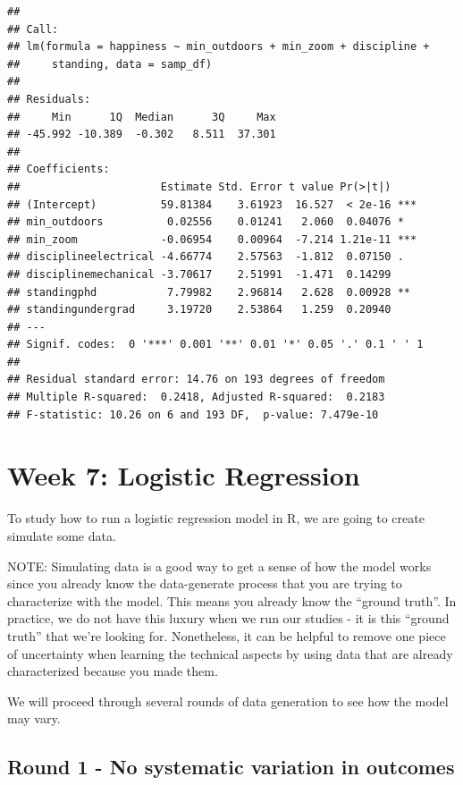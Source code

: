 \documentclass[
]{book}
\begin{document}
\begin{verbatim}
## 
## Call:
## lm(formula = happiness ~ min_outdoors + min_zoom + discipline + 
##     standing, data = samp_df)
## 
## Residuals:
##     Min      1Q  Median      3Q     Max 
## -45.992 -10.389  -0.302   8.511  37.301 
## 
## Coefficients:
##                      Estimate Std. Error t value Pr(>|t|)    
## (Intercept)          59.81384    3.61923  16.527  < 2e-16 ***
## min_outdoors          0.02556    0.01241   2.060  0.04076 *  
## min_zoom             -0.06954    0.00964  -7.214 1.21e-11 ***
## disciplineelectrical -4.66774    2.57563  -1.812  0.07150 .  
## disciplinemechanical -3.70617    2.51991  -1.471  0.14299    
## standingphd           7.79982    2.96814   2.628  0.00928 ** 
## standingundergrad     3.19720    2.53864   1.259  0.20940    
## ---
## Signif. codes:  0 '***' 0.001 '**' 0.01 '*' 0.05 '.' 0.1 ' ' 1
## 
## Residual standard error: 14.76 on 193 degrees of freedom
## Multiple R-squared:  0.2418, Adjusted R-squared:  0.2183 
## F-statistic: 10.26 on 6 and 193 DF,  p-value: 7.479e-10
\end{verbatim}

\hypertarget{week-7-logistic-regression}{%
\chapter{Week 7: Logistic Regression}\label{week-7-logistic-regression}}

To study how to run a logistic regression model in R, we are going to create simulate some data.

NOTE: Simulating data is a good way to get a sense of how the model works since you already know the data-generate process that you are trying to characterize with the model. This means you already know the ``ground truth''. In practice, we do not have this luxury when we run our studies - it is this ``ground truth'' that we're looking for.
Nonetheless, it can be helpful to remove one piece of uncertainty when learning the technical aspects by using data that are already characterized because you made them.

We will proceed through several rounds of data generation to see how the model may vary.

\hypertarget{round-1---no-systematic-variation-in-outcomes}{%
\section{Round 1 - No systematic variation in outcomes}\label{round-1---no-systematic-variation-in-outcomes}}
\end{document}
